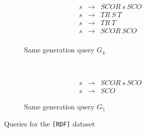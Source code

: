 \begin{figure}[h]
    \centering
    \begin{subfigure}[b]{0.24\textwidth}
        \centering
        \[
         \begin{array}{rcl}
           s & \rightarrow & SCOR \ s \ SCO \\
           s & \rightarrow & TR \ S \ T     \\
           s & \rightarrow & TR \ T     \\
           s & \rightarrow & SCOR \ SCO     \\
         \end{array}
         \]
        \caption{Same generation query $G_4$}
    \end{subfigure}%
    ~
    \begin{subfigure}[b]{0.24\textwidth}
        \centering
        \[
         \begin{array}{rcl}
           s & \rightarrow & SCOR \ s \ SCO \\
           s & \rightarrow & SCO
         \end{array}
         \]
        \caption{Same generation query $G_5$}
    \end{subfigure}
    \caption{Queries for the \texttt{[RDF]} dataset}
    \label{fig:grammar_rdf}
\end{figure}
